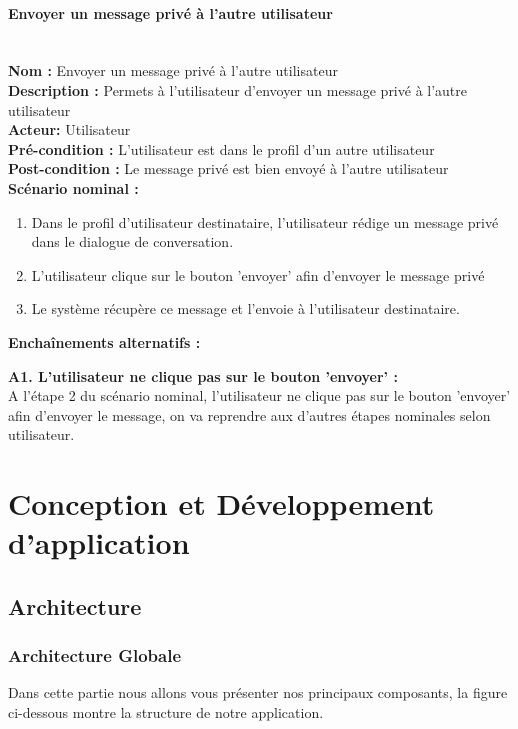 \documentclass[12pt]{article}
\begin{document}
\paragraph{Envoyer un message privé à l'autre utilisateur}
\leavevmode \\
\textbf{Nom :} Envoyer un message privé à l'autre utilisateur\\
\textbf{Description :} Permets à l'utilisateur d'envoyer un message privé à l'autre utilisateur\\
\textbf{Acteur: } Utilisateur\\
\textbf{Pré-condition : } L'utilisateur est dans le profil d'un autre utilisateur\\
\textbf{Post-condition : } Le message privé est bien envoyé à l'autre utilisateur\\
\textbf{Scénario nominal : }
\begin{enumerate}
    \item Dans le profil d'utilisateur destinataire, l'utilisateur rédige un message privé dans le dialogue de conversation.
    \item L'utilisateur clique sur le bouton 'envoyer' afin d'envoyer le message privé
    \item Le système récupère ce message et l'envoie à l'utilisateur destinataire.
\end{enumerate}

\textbf{Enchaînements alternatifs : }
\begin{description}
    \item \textbf{A1. L'utilisateur ne clique pas sur le bouton 'envoyer' : }\\
    A l'étape 2 du scénario nominal, l'utilisateur ne clique pas sur le bouton 'envoyer' afin d'envoyer le message, on va reprendre aux d'autres étapes nominales selon utilisateur.   
\end{description}

\newpage
\section{Conception et Développement d'application}



\subsection{Architecture}
\subsubsection{Architecture Globale}
Dans cette partie nous allons vous présenter nos principaux composants, la figure ci-dessous montre la structure de notre application.
\end{document}
